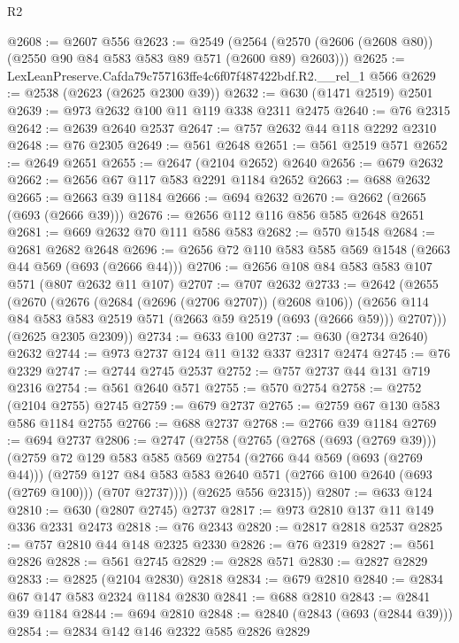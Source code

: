 \begin{lexlean}{R2}
\begin{coremodule}
@2608 := @2607 @556
@2623 := @2549
    (@2564 (@2570 (@2606 (@2608 @80)) (@2550 @90 @84 @583 @583 @89 @571 (@2600 @89) @2603)))
@2625 := LexLeanPreserve.Cafda79c757163ffe4c6f07f487422bdf.R2.__rel_1 @566
@2629 := @2538 (@2623 (@2625 @2300 @39))
@2632 := @630 (@1471 @2519) @2501
@2639 := @973 @2632 @100 @11 @119 @338 @2311 @2475
@2640 := @76 @2315
@2642 := @2639 @2640 @2537
@2647 := @757 @2632 @44 @118 @2292 @2310
@2648 := @76 @2305
@2649 := @561 @2648
@2651 := @561 @2519 @571
@2652 := @2649 @2651
@2655 := @2647 (@2104 @2652) @2640
@2656 := @679 @2632
@2662 := @2656 @67 @117 @583 @2291 @1184 @2652
@2663 := @688 @2632
@2665 := @2663 @39 @1184
@2666 := @694 @2632
@2670 := @2662 (@2665 (@693 (@2666 @39)))
@2676 := @2656 @112 @116 @856 @585 @2648 @2651
@2681 := @669 @2632 @70 @111 @586 @583
@2682 := @570 @1548
@2684 := @2681 @2682 @2648
@2696 := @2656 @72 @110 @583 @585 @569 @1548 (@2663 @44 @569 (@693 (@2666 @44)))
@2706 := @2656 @108 @84 @583 @583 @107 @571 (@807 @2632 @11 @107)
@2707 := @707 @2632
@2733 := @2642
    (@2655
      (@2670
        (@2676
          (@2684 (@2696 (@2706 @2707)) (@2608 @106))
          (@2656 @114 @84 @583 @583 @2519 @571 (@2663 @59 @2519 (@693 (@2666 @59))) @2707)))
      (@2625 @2305 @2309))
@2734 := @633 @100
@2737 := @630 (@2734 @2640) @2632
@2744 := @973 @2737 @124 @11 @132 @337 @2317 @2474
@2745 := @76 @2329
@2747 := @2744 @2745 @2537
@2752 := @757 @2737 @44 @131 @719 @2316
@2754 := @561 @2640 @571
@2755 := @570 @2754
@2758 := @2752 (@2104 @2755) @2745
@2759 := @679 @2737
@2765 := @2759 @67 @130 @583 @586 @1184 @2755
@2766 := @688 @2737
@2768 := @2766 @39 @1184
@2769 := @694 @2737
@2806 := @2747
    (@2758
      (@2765
        (@2768 (@693 (@2769 @39)))
        (@2759
          @72
          @129
          @583
          @585
          @569
          @2754
          (@2766 @44 @569 (@693 (@2769 @44)))
          (@2759
            @127
            @84
            @583
            @583
            @2640
            @571
            (@2766 @100 @2640 (@693 (@2769 @100)))
            (@707 @2737))))
      (@2625 @556 @2315))
@2807 := @633 @124
@2810 := @630 (@2807 @2745) @2737
@2817 := @973 @2810 @137 @11 @149 @336 @2331 @2473
@2818 := @76 @2343
@2820 := @2817 @2818 @2537
@2825 := @757 @2810 @44 @148 @2325 @2330
@2826 := @76 @2319
@2827 := @561 @2826
@2828 := @561 @2745
@2829 := @2828 @571
@2830 := @2827 @2829
@2833 := @2825 (@2104 @2830) @2818
@2834 := @679 @2810
@2840 := @2834 @67 @147 @583 @2324 @1184 @2830
@2841 := @688 @2810
@2843 := @2841 @39 @1184
@2844 := @694 @2810
@2848 := @2840 (@2843 (@693 (@2844 @39)))
@2854 := @2834 @142 @146 @2322 @585 @2826 @2829

\end{coremodule}
\end{lexlean}
